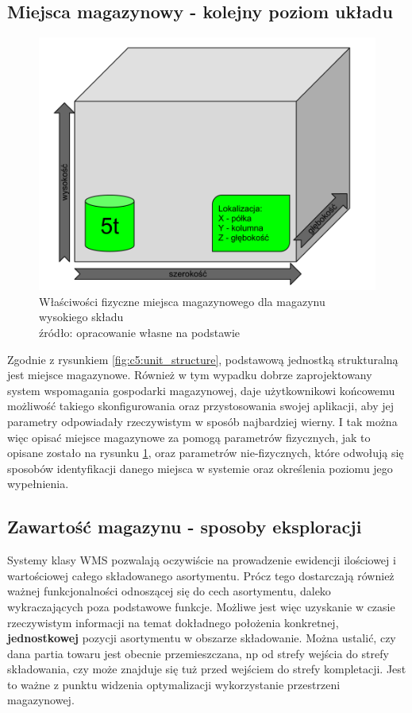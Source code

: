 	\subsection{Miejsca magazynowy - kolejny poziom układu}
		\begin{figure}[h]
			\centering
			\includegraphics[width=\textwidth]{images/storage_unit_description}
			\caption[Miejsce magazynowe - właściwości fizyczne]{
					Właściwości fizyczne miejsca magazynowego dla magazynu wysokiego składu \\
					źródło: opracowanie własne na podstawie \cite{IDL}
			}
			\label{fig:c5:storage_unit_description}
		\end{figure}
		Zgodnie z rysunkiem \ref{fig:c5:unit_structure}, podstawową jednostką strukturalną jest miejsce magazynowe.
		Również w tym wypadku dobrze zaprojektowany system wspomagania gospodarki magazynowej, daje 
		użytkownikowi końcowemu możliwość takiego skonfigurowania oraz przystosowania swojej aplikacji,
		aby jej parametry odpowiadały rzeczywistym w sposób najbardziej wierny. I tak można więc opisać miejsce 
		magazynowe za pomogą parametrów fizycznych, jak to opisane zostało na rysunku \ref{fig:c5:storage_unit_description},
		oraz parametrów nie-fizycznych, które odwołują się sposobów identyfikacji danego miejsca 
		w systemie oraz określenia poziomu jego wypełnienia. 
	\subsection{Zawartość magazynu - sposoby eksploracji}
		Systemy klasy WMS pozwalają oczywiście na prowadzenie ewidencji ilościowej i wartościowej całego
		składowanego asortymentu. Prócz tego dostarczają również ważnej funkcjonalności odnoszącej się do cech asortymentu,
		daleko wykraczających poza podstawowe funkcje. Możliwe jest więc uzyskanie w czasie rzeczywistym informacji na temat
		dokładnego położenia konkretnej, \textbf{jednostkowej} pozycji asortymentu w obszarze składowanie. Można 
		ustalić, czy dana partia towaru jest obecnie przemieszczana, np od strefy wejścia do strefy składowania, czy może
		znajduje się tuż przed wejściem do strefy kompletacji. Jest to ważne z punktu widzenia optymalizacji
		wykorzystanie przestrzeni magazynowej. \\
		
